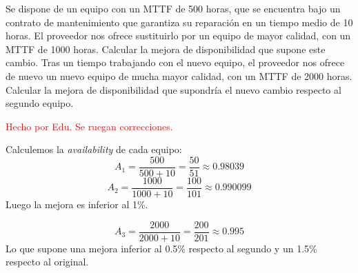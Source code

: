\begin{problem}[1]
Se dispone de un equipo con un MTTF de 500 horas, que se encuentra bajo un contrato de mantenimiento que garantiza su reparación en un tiempo medio de 10 horas.
  \ppart El proveedor nos ofrece sustituirlo por un equipo de mayor calidad, con un MTTF de 1000 horas. Calcular la mejora de disponibilidad que supone este cambio.
  \ppart Tras un tiempo trabajando con el nuevo equipo, el proveedor nos ofrece de nuevo un nuevo equipo de mucha mayor calidad, con un MTTF de 2000 horas. Calcular la mejora de disponibilidad que supondría el nuevo cambio respecto al segundo equipo.

\solution
\textcolor{red}{Hecho por Edu. Se ruegan correcciones.}

\spart
  Calculemos la \textit{availability} de cada equipo:
  \[ A_1 = \frac{500}{500+10} = \frac{50}{51} \approx 0.98039 \]
  \[ A_2 = \frac{1000}{1000+10} = \frac{100}{101} \approx 0.990099 \]
  Luego la mejora es inferior al 1\%.

\spart
  \[ A_3 = \frac{2000}{2000+10} = \frac{200}{201} \approx 0.995 \]
  Lo que supone una mejora inferior al 0.5\% respecto al segundo y un 1.5\% respecto al original.

\end{problem}

